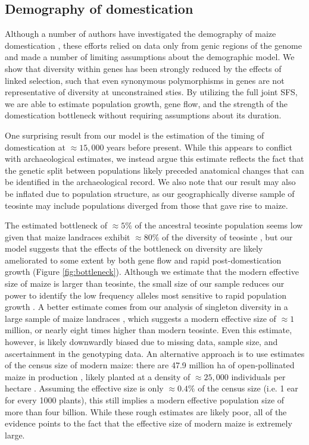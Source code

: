 \documentclass{pnastwo}
\begin{document}
\begin{article}
\subsection{Demography of domestication}
Although a number of authors have investigated the demography of maize domestication \cite{eyre1998, tenaillon2004selection, wright2005}, these  efforts relied on data only from genic regions of the genome and made a number of limiting assumptions about the demographic model.  
We show that diversity within genes has been strongly reduced by the effects of linked selection, such that even synonymous polymorphisms in genes are not representative of diversity at unconstrained sties.  
By utilizing the full joint SFS, we are able to estimate population growth, gene flow, and the strength of the domestication bottleneck without requiring assumptions about its duration.  

One surprising result from our model is the estimation of the timing of domestication at $\approx 15,000$ years before present.
While this appears to conflict with archaeological \cite{piperno2009starch} estimates, we instead argue this estimate reflects the fact that the genetic split between populations likely preceded anatomical changes that can be identified in the archaeological record. 
We also note that our result may also be inflated due to population structure, as our geographically diverse sample of teosinte may include populations diverged from those that gave rise to maize.

The estimated bottleneck of $\approx 5\%$ of the ancestral teosinte population seems low given that maize landraces exhibit $\approx 80\%$ of the diversity of teosinte \citep{hufford2012}, but our model suggests that the effects of the bottleneck on diversity are likely ameliorated to some extent by both gene flow and rapid post-domestication growth (Figure \ref{fig:bottleneck}).   
Although we estimate that the modern effective size of maize is larger than teosinte, the small size of our sample reduces our power to identify the low frequency alleles most sensitive to rapid population growth \cite{keinan2012}.  
A better estimate comes from our analysis of singleton diversity in a large sample of maize landraces \cite{Hearne2015}, which suggests a modern effective size of $\approx 1$ million, or nearly eight times higher than modern teosinte.
Even this estimate, however, is likely downwardly biased due to missing data, sample size, and ascertainment in the genotyping data.
An alternative approach is to use estimates of the census size of modern maize: there are 47.9 million ha of open-pollinated maize in production \cite{cimmyt1999}, likely planted at a density of $\approx 25,000$ individuals  per hectare \cite{baden2001culture}.
Assuming the effective size is only $\approx 0.4\%$ of the census size (i.e. 1 ear for every 1000 plants), this still implies a modern effective population size of more than four billion.
While these rough estimates are likely poor, all of the evidence points to the fact that the effective size of modern maize is extremely large.


\end{article}
\end{document}
